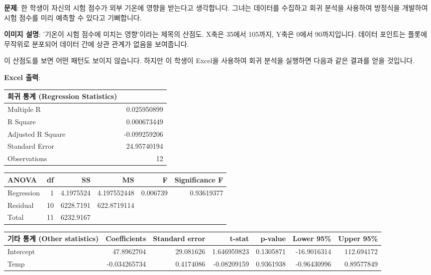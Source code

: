 \documentclass[11pt,a4paper]{book}
\theoremstyle{definition}
\begin{document}
\begin{tcolorbox}[examplebox, title={예시: 기온이 시험 점수에 미치는 영향}]
\textbf{문제}: 한 학생이 자신의 시험 점수가 외부 기온에 영향을 받는다고 생각합니다. 그녀는 데이터를 수집하고 회귀 분석을 사용하여 방정식을 개발하여 시험 점수를 미리 예측할 수 있다고 기뻐합니다.

\begin{center}
\end{center}
\textbf{이미지 설명}: '기온이 시험 점수에 미치는 영향'이라는 제목의 산점도. X축은 35에서 105까지, Y축은 0에서 90까지입니다. 데이터 포인트는 플롯에 무작위로 분포되어 데이터 간에 상관 관계가 없음을 보여줍니다.

이 산점도를 보면 어떤 패턴도 보이지 않습니다. 하지만 이 학생이 Excel을 사용하여 회귀 분석을 실행하면 다음과 같은 결과를 얻을 것입니다.

\textbf{Excel 출력}:
\begin{adjustbox}{max width=\textwidth}
\begin{tabular}{lr}
\toprule
\textbf{회귀 통계 (Regression Statistics)} & \\
\midrule
Multiple R & 0.025950899 \\
R Square & 0.000673449 \\
Adjusted R Square & -0.099259206 \\
Standard Error & 24.95740194 \\
Observations & 12 \\
\bottomrule
\end{tabular}
\end{adjustbox}

\begin{adjustbox}{max width=\textwidth}
\begin{tabular}{lrrrrr}
\toprule
\textbf{ANOVA} & \textbf{df} & \textbf{SS} & \textbf{MS} & \textbf{F} & \textbf{Significance F} \\
\midrule
Regression & 1 & 4.1975524 & 4.197552448 & 0.006739 & 0.93619377 \\
Residual & 10 & 6228.7191 & 622.8719114 & & \\
Total & 11 & 6232.9167 & & & \\
\bottomrule
\end{tabular}
\end{adjustbox}

\begin{adjustbox}{max width=\textwidth}
\begin{tabular}{lrrrrrr}
\toprule
\textbf{기타 통계 (Other statistics)} & \textbf{Coefficients} & \textbf{Standard error} & \textbf{t-stat} & \textbf{p-value} & \textbf{Lower 95\%} & \textbf{Upper 95\%} \\
\midrule
Intercept & 47.8962704 & 29.081626 & 1.646959823 & 0.1305871 & -16.9016314 & 112.694172 \\
Temp & -0.034265734 & 0.4174086 & -0.08209159 & 0.9361938 & -0.96430996 & 0.89577849 \\
\bottomrule
\end{tabular}
\end{adjustbox}


\end{tcolorbox}
\end{document}
